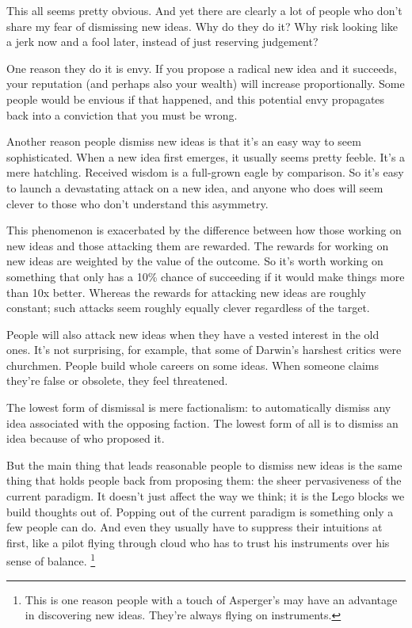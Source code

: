 \documentclass[12pt]{book}
\begin{document}
This all seems pretty obvious. And yet there are clearly a lot of people
who don't share my fear of dismissing new ideas. Why do they do it? Why
risk looking like a jerk now and a fool later, instead of just reserving
judgement?

One reason they do it is envy. If you propose a radical new idea and it
succeeds, your reputation (and perhaps also your wealth) will increase
proportionally. Some people would be envious if that happened, and this
potential envy propagates back into a conviction that you must be wrong.

Another reason people dismiss new ideas is that it's an easy way to seem
sophisticated. When a new idea first emerges, it usually seems pretty
feeble. It's a mere hatchling. Received wisdom is a full-grown eagle by
comparison. So it's easy to launch a devastating attack on a new idea,
and anyone who does will seem clever to those who don't understand this
asymmetry.

This phenomenon is exacerbated by the difference between how those
working on new ideas and those attacking them are rewarded. The rewards
for working on new ideas are weighted by the value of the outcome. So
it's worth working on something that only has a 10\% chance of
succeeding if it would make things more than 10x better. Whereas the
rewards for attacking new ideas are roughly constant; such attacks seem
roughly equally clever regardless of the target.

People will also attack new ideas when they have a vested interest in
the old ones. It's not surprising, for example, that some of Darwin's
harshest critics were churchmen. People build whole careers on some
ideas. When someone claims they're false or obsolete, they feel
threatened.

The lowest form of dismissal is mere factionalism: to automatically
dismiss any idea associated with the opposing faction. The lowest form
of all is to dismiss an idea because of who proposed it.

But the main thing that leads reasonable people to dismiss new ideas is
the same thing that holds people back from proposing them: the sheer
pervasiveness of the current paradigm. It doesn't just affect the way we
think; it is the Lego blocks we build thoughts out of. Popping out of
the current paradigm is something only a few people can do. And even
they usually have to suppress their intuitions at first, like a pilot
flying through cloud who has to trust his instruments over his sense of
balance. \footnote{This is one reason people with a touch of Asperger's may have an
advantage in discovering new ideas. They're always flying on
instruments.}
\end{document}
